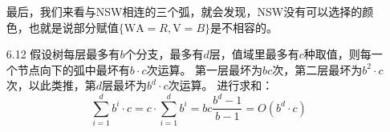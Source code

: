 \documentclass[UTF8,zihao=-4]{ctexart}
\begin{document}
\begin{itemize}
		最后，我们来看与NSW相连的三个弧，就会发现，NSW没有可以选择的颜色，也就是说部分赋值$\{\text{WA}=R,\text{V}=B\}$是不相容的。
		\item[6.12] 假设树每层最多有$b$个分支，最多有$d$层，值域里最多有$c$种取值，则每一个节点向下的弧中最坏有$b\cdot c$次运算。
		第一层最坏为$bc$次，第二层最坏为$b^2\cdot c$次，以此类推，第$d$层最坏为$b^d\cdot c$次运算。
		进行求和：
		\begin{equation*}
			\sum_{i=1}^d b^i \cdot c = c \cdot \sum_{i=1}^d b^i = bc\frac{b^d-1}{b-1} = O(b^d \cdot c)
		\end{equation*}
	\end{itemize}
\end{document}

